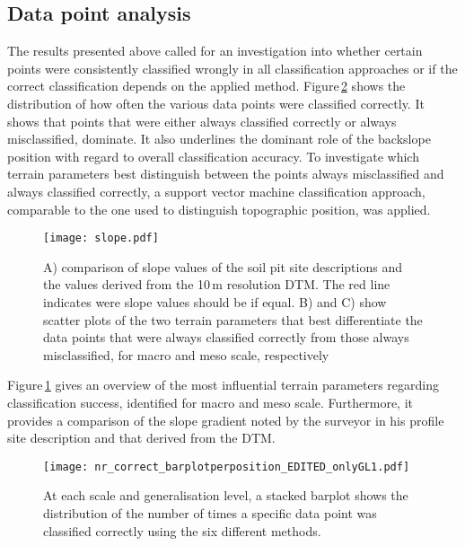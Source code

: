 \documentclass[preprint,12pt,authoryear]{elsarticle}
\begin{document}
\subsection{Data point analysis} 
The results presented above called for an investigation into whether certain points were consistently classified wrongly in all classification approaches or if the correct classification depends on the applied method. Figure\,\ref{fig:hist_correct_per_tp} shows the distribution of how often the various data points were classified correctly. It shows that points that were either always classified correctly or always misclassified, dominate. It also underlines the dominant role of the backslope position with regard to overall classification accuracy. To investigate which terrain parameters best distinguish between the points always misclassified and always classified correctly, a support vector machine classification approach, comparable to the one used to distinguish topographic position, was applied.
\begin{figure}
\texttt{[image: slope.pdf]}
\caption{A) comparison of slope values of the soil pit site descriptions and the  values derived from the 10\,m resolution DTM. The red line indicates were slope values should be if equal. B) and C) show scatter plots of the two terrain parameters that best differentiate the data points that were always classified correctly from those always misclassified, for macro and meso scale, respectively}
\label{fig:slope}
\end{figure}
 Figure\,\ref{fig:slope} gives an overview of the most influential terrain parameters regarding classification success, identified for macro and meso scale. Furthermore, it provides a comparison of the slope gradient noted by the surveyor in his profile site description and that derived from the DTM.

\begin{figure}
\texttt{[image: nr\_correct\_barplotperposition\_EDITED\_onlyGL1.pdf]}
\caption{At each scale and generalisation level, a stacked barplot shows the distribution of the number of times a specific data point was classified correctly using the six different methods.}
\label{fig:hist_correct_per_tp}
\end{figure}
\end{document}
